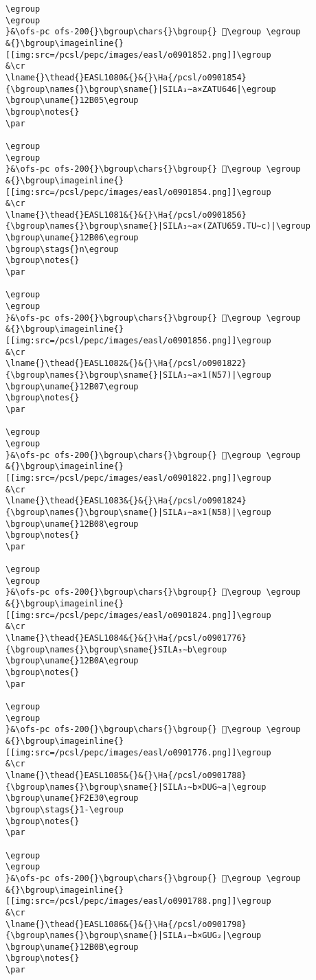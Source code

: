 \begin{verbatim}
\egroup
\egroup
}&\ofs-pc ofs-200{}\bgroup\chars{}\bgroup{} 𒬄\egroup \egroup
&{}\bgroup\imageinline{}[[img:src=/pcsl/pepc/images/easl/o0901852.png]]\egroup
&\cr
\lname{}\thead{}EASL1080&{}&{}\Ha{/pcsl/o0901854}{\bgroup\names{}\bgroup\sname{}|SILA₃∼a×ZATU646|\egroup
\bgroup\uname{}12B05\egroup
\bgroup\notes{}
\par 

\egroup
\egroup
}&\ofs-pc ofs-200{}\bgroup\chars{}\bgroup{} 𒬅\egroup \egroup
&{}\bgroup\imageinline{}[[img:src=/pcsl/pepc/images/easl/o0901854.png]]\egroup
&\cr
\lname{}\thead{}EASL1081&{}&{}\Ha{/pcsl/o0901856}{\bgroup\names{}\bgroup\sname{}|SILA₃∼a×(ZATU659.TU∼c)|\egroup
\bgroup\uname{}12B06\egroup
\bgroup\stags{}n\egroup
\bgroup\notes{}
\par 

\egroup
\egroup
}&\ofs-pc ofs-200{}\bgroup\chars{}\bgroup{} 𒬆\egroup \egroup
&{}\bgroup\imageinline{}[[img:src=/pcsl/pepc/images/easl/o0901856.png]]\egroup
&\cr
\lname{}\thead{}EASL1082&{}&{}\Ha{/pcsl/o0901822}{\bgroup\names{}\bgroup\sname{}|SILA₃∼a×1(N57)|\egroup
\bgroup\uname{}12B07\egroup
\bgroup\notes{}
\par 

\egroup
\egroup
}&\ofs-pc ofs-200{}\bgroup\chars{}\bgroup{} 𒬇\egroup \egroup
&{}\bgroup\imageinline{}[[img:src=/pcsl/pepc/images/easl/o0901822.png]]\egroup
&\cr
\lname{}\thead{}EASL1083&{}&{}\Ha{/pcsl/o0901824}{\bgroup\names{}\bgroup\sname{}|SILA₃∼a×1(N58)|\egroup
\bgroup\uname{}12B08\egroup
\bgroup\notes{}
\par 

\egroup
\egroup
}&\ofs-pc ofs-200{}\bgroup\chars{}\bgroup{} 𒬈\egroup \egroup
&{}\bgroup\imageinline{}[[img:src=/pcsl/pepc/images/easl/o0901824.png]]\egroup
&\cr
\lname{}\thead{}EASL1084&{}&{}\Ha{/pcsl/o0901776}{\bgroup\names{}\bgroup\sname{}SILA₃∼b\egroup
\bgroup\uname{}12B0A\egroup
\bgroup\notes{}
\par 

\egroup
\egroup
}&\ofs-pc ofs-200{}\bgroup\chars{}\bgroup{} 𒬊\egroup \egroup
&{}\bgroup\imageinline{}[[img:src=/pcsl/pepc/images/easl/o0901776.png]]\egroup
&\cr
\lname{}\thead{}EASL1085&{}&{}\Ha{/pcsl/o0901788}{\bgroup\names{}\bgroup\sname{}|SILA₃∼b×DUG∼a|\egroup
\bgroup\uname{}F2E30\egroup
\bgroup\stags{}1-\egroup
\bgroup\notes{}
\par 

\egroup
\egroup
}&\ofs-pc ofs-200{}\bgroup\chars{}\bgroup{} 󲸰\egroup \egroup
&{}\bgroup\imageinline{}[[img:src=/pcsl/pepc/images/easl/o0901788.png]]\egroup
&\cr
\lname{}\thead{}EASL1086&{}&{}\Ha{/pcsl/o0901798}{\bgroup\names{}\bgroup\sname{}|SILA₃∼b×GUG₂|\egroup
\bgroup\uname{}12B0B\egroup
\bgroup\notes{}
\par 


\end{verbatim}
